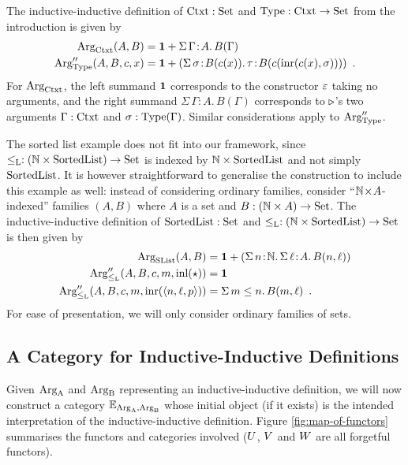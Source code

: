 \documentclass[orivec,envcountsame, ,envcountsect]{llncs}
\begin{document}
\begin{example}
\label{ex:ctxtTy-functor}
The inductive-inductive definition of $\text{Ctxt} : \text{Set}$ and $\text{Type} :
\text{Ctxt} \to \text{Set}$ from the introduction is given by
\begin{align*}
  \text{Arg}_{\text{Ctxt}}(A, B) &= \mathbf{1} + \Sigma\, \Gamma\!:\!A .\, B(\Gamma)\\
  \text{Arg}_{\text{Type}}''(A, B, c, x) &= \mathbf{1} + (\Sigma\,  \sigma\!:\! B(c(x)).\, \tau\!:\!B(c(\text{inr}(c(x), \sigma))) ) \enspace .
\end{align*}
For $\text{Arg}_{\text{Ctxt}}$, the left summand $\mathbf{1}$ corresponds to the constructor
$\varepsilon$ taking no arguments, and the right summand $\Sigma\,
\Gamma\!:\!A .\, B(\Gamma)$ corresponds to $ \triangleright $'s two
arguments $\Gamma : \text{Ctxt}$ and $\sigma : \text{Type}(\Gamma)$. Similar
considerations apply to $\text{Arg}_{\text{Type}}''$.

\end{example}

\begin{example}
\label{ex:SList-functor}
The sorted list example does not fit into our framework, since
$\leq_{\text{L}} : (\mathbb{N} \times \text{SortedList}) \to \text{Set}$ is indexed by $\mathbb{N}
\times \text{SortedList}$ and not simply $\text{SortedList}$. It is however
straightforward to generalise the construction to include this example
as well: instead of considering ordinary families, consider
``${\mathbb{N}\!\times\!A }$-indexed'' families $(A, B)$ where $A$ is a set
and $B : (\mathbb{N} \times A) \to \text{Set}$.  The inductive-inductive
definition of $\text{SortedList} : \text{Set}$ and $\leq_{\text{L}} : (\mathbb{N} \times
\text{SortedList}) \to \text{Set}$ is then given by
\begin{align*}
  \text{Arg}_{\text{SList}}(A, B) &= \mathbf{1} + (\Sigma\, n\!:\!\mathbb{N} .\,\Sigma\,\ell\!:\!A.\, B(n,\ell))\\
  \text{Arg}_{\leq_{\text{L}}}''(A, B, c, m, \text{inl}(\star)) &= \mathbf{1} \\
  \text{Arg}_{\leq_{\text{L}}}''(A, B, c, m, \text{inr}(\langle n, \ell, p\rangle)) &= \Sigma\,m \leq n.\, B(m, \ell) \enspace .
\end{align*}
For ease of presentation, we will only consider ordinary families of
sets.

\end{example}


\subsection{A Category for Inductive-Inductive Definitions}

Given $\text{Arg}_{\text{A}}$ and $\text{Arg}_{\text{B}}$ representing an inductive-inductive
definition, we will now construct a category $\mathbb{E}_{\text{Arg}_{\text{A}}, \text{Arg}_{\text{B}}}$
whose initial object (if it exists) is the intended interpretation of
the inductive-inductive definition. Figure \ref{fig:map-of-functors}
summarises the functors and categories involved ($U$,
$V$ and $W$ are all forgetful functors).
\end{document}
